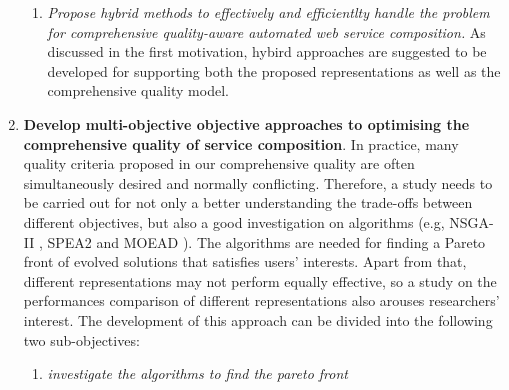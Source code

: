 \begin{enumerate}
\begin{enumerate}
    \item \emph{Propose hybrid methods to effectively and efficientlty handle the problem for comprehensive quality-aware automated web service composition.} As discussed in the first motivation, hybird approaches are suggested to be developed for supporting both the proposed representations as well as the comprehensive quality model. 
  \end{enumerate}
 
 \item \textbf{Develop multi-objective objective approaches to optimising the comprehensive quality of service composition}. In practice, many quality criteria proposed in our comprehensive quality are often simultaneously desired and normally conflicting. Therefore, a study needs to be carried out for not only a better understanding the trade-offs between different objectives, but also a good investigation on algorithms (e.g, NSGA-II \cite{deb2002fast}, SPEA2 \cite{} and MOEAD \cite{}). The algorithms are needed for finding a Pareto front of evolved solutions that satisfies users' interests. Apart from that, different representations may not perform equally effective, so a study on the performances comparison of different representations also arouses researchers' interest. The development of this approach can be divided into the following two sub-objectives:
  

 
   \begin{enumerate}
    \item \emph{investigate the algorithms to find the pareto front }\\
    

\end{enumerate}
\end{enumerate}
